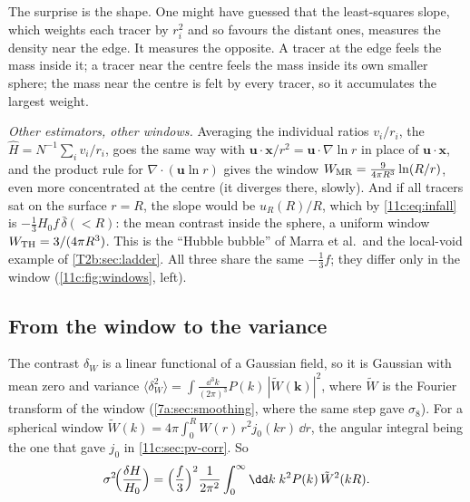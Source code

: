 The surprise is the shape. One might have guessed that the least-squares slope,
which weights each tracer by $r_i^2$ and so favours the distant ones, measures the
density near the edge. It measures the opposite. A tracer at the edge feels the
mass inside it; a tracer near the centre feels the mass inside its own smaller
sphere; the mass near the centre is felt by every tracer, so it accumulates the
largest weight.

\emph{Other estimators, other windows.} Averaging the individual ratios
$v_i/r_i$, the  $\hat H=N^{-1}\sum_iv_i/r_i$, goes the same way
with $\bm u\cdot\bm x/r^2=\bm u\cdot\nabla\ln r$ in place of $\bm u\cdot\bm x$, and the
product rule for $\nabla\cdot(\bm u\ln r)$ gives the window
$W_{\rm MR}=\frac{9}{4\pi R^3}\ln(R/r)$, even more concentrated at the centre (it
diverges there, slowly). And if all tracers sat on the surface $r=R$, the slope
would be $u_R(R)/R$, which by \eqref{11c:eq:infall} is $-\tfrac13H_0f\,\bar\delta(<R)$: the
mean contrast inside the sphere, a uniform  window
$W_{\rm TH}=3/(4\pi R^3)$. This is the ``Hubble bubble'' of Marra et al.\ and the
local-void example of \cref{T2b:sec:ladder}. All three share the same
$-\tfrac13f$; they differ only in the window (\cref{11c:fig:windows}, left).

\subsection{From the window to the variance}
\label{11c:sec:window-variance}

The contrast $\delta_W$ is a linear functional of a Gaussian field, so it is
Gaussian with mean zero and variance
$\langle\delta_W^2\rangle=\int\frac{\dd^3k}{(2\pi)^3}P(k)\,|\tilde W(\bm k)|^2$, where
$\tilde W$ is the Fourier transform of the window (\cref{7a:sec:smoothing}, where
the same step gave $\sigma_8$). For a spherical window
$\tilde W(k)=4\pi\int_0^RW(r)\,r^2j_0(kr)\,\dd r$, the angular integral being the one
that gave $j_0$ in \cref{11c:sec:pv-corr}. So
\begin{equation}
  \sigma^2\!\Bigl(\frac{\delta H}{H_0}\Bigr)=\Bigl(\frac f3\Bigr)^2\frac{1}{2\pi^2}
  \int_0^\infty\dd k\;k^2P(k)\,\tilde W^2(kR).
  \label{11c:eq:sigma-H}
\end{equation}


